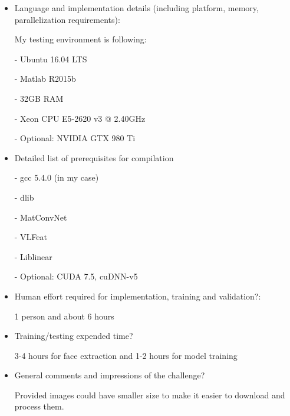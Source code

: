 \documentclass{article}
\begin{document}
\begin{itemize}
\item Language and implementation details (including platform, memory, parallelization requirements): 

My testing environment is following:

- Ubuntu 16.04 LTS

- Matlab R2015b

- 32GB RAM

- Xeon CPU E5-2620 v3 @ 2.40GHz

- Optional: NVIDIA GTX 980 Ti

\item Detailed list of prerequisites for compilation

- gcc 5.4.0 (in my case)

- dlib

- MatConvNet

- VLFeat

- Liblinear

- Optional: CUDA 7.5, cuDNN-v5

\item Human effort required for implementation, training and validation?: 

1 person and about 6 hours

\item Training/testing expended time? 

3-4 hours for face extraction and 1-2 hours for model training

\item General comments and impressions of the challenge?

Provided images could have smaller size to make it easier to download and process them.

\end{itemize}
\end{document}
